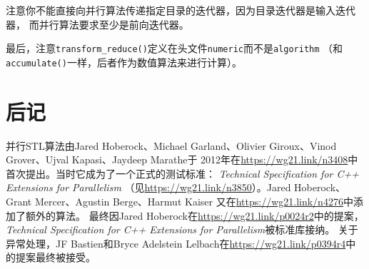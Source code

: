 注意你不能直接向并行算法传递指定目录的迭代器，因为目录迭代器是输入迭代器，
而并行算法要求至少是前向迭代器。

最后，注意\texttt{transform\_reduce()}定义在头文件\texttt{numeric}而不是\texttt{algorithm}
（和\texttt{accumulate()}一样，后者作为数值算法来进行计算）。


\section{后记}
并行STL算法由Jared Hoberock、Michael Garland、Olivier Giroux、Vinod Grover、Ujval Kapasi、Jaydeep Marathe于
2012年在\url{https://wg21.link/n3408}中首次提出。当时它成为了一个正式的测试标准：
\emph{Technical Specification for C++ Extensions for Parallelism}
（见\url{https://wg21.link/n3850}）。Jared Hoberock、Grant Mercer、Agustin Berge、Harmut Kaiser
又在\url{https://wg21.link/n4276}中添加了额外的算法。
最终因Jared Hoberock在\url{https://wg21.link/p0024r2}中的提案，
\emph{Technical Specification for C++ Extensions for Parallelism}被标准库接纳。
关于异常处理，JF Bastien和Bryce Adelstein Lelbach在\url{https://wg21.link/p0394r4}中的提案最终被接受。